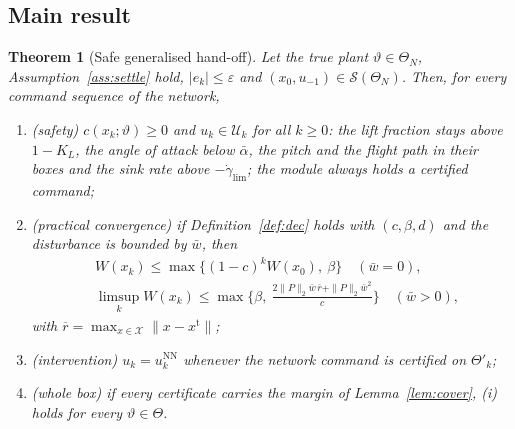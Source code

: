 \documentclass[final,5p,times,twocolumn]{elsarticle}
\newtheorem{theorem}{Theorem}\newtheorem{lemma}{Lemma}\newtheorem{proposition}{Proposition}\newtheorem{definition}{Definition}\newtheorem{assumption}{Assumption}\newtheorem{fact}{Fact}
\begin{document}
\subsection{Main result}
\begin{theorem}[Safe generalised hand-off]\label{thm:main}
Let the true plant $\vartheta\in\Theta_N$, Assumption~\ref{ass:settle} hold, $|e_k|\le\varepsilon$ and $(x_0,u_{-1})\in\mathcal S(\Theta_N)$. Then, for every command sequence of the network,
\begin{enumerate}[label=(\roman*),leftmargin=2em]
\item (safety) $c(x_k;\vartheta)\ge0$ and $u_k\in\mathcal U_k$ for all $k\ge0$: the lift fraction stays above $1-K_L$, the angle of attack below $\bar\alpha$, the pitch and the flight path in their boxes and the sink rate above $-\dot\gamma_{\lim}$; the module always holds a certified command;
\item (practical convergence) if Definition~\ref{def:dec} holds with $(c,\beta,d)$ and the disturbance is bounded by $\bar w$, then
\begin{equation}\label{eq:conv}
\begin{aligned}&W(x_k)\le\max\{(1-c)^kW(x_0),\ \beta\}\quad(\bar w=0),\\ &\limsup_{k}W(x_k)\le\max\Big\{\beta,\ \frac{2\|P\|_2\bar w\,\overline r+\|P\|_2\bar w^2}{c}\Big\}\quad(\bar w>0),\end{aligned}
\end{equation}
with $\overline r=\max_{x\in\mathcal X}\|x-x^{\mathrm t}\|$;
\item (intervention) $u_k=u^{\mathrm{NN}}_k$ whenever the network command is certified on $\Theta'_k$;
\item (whole box) if every certificate carries the margin of Lemma~\ref{lem:cover}, (i) holds for every $\vartheta\in\Theta$.
\end{enumerate}
\end{theorem}
\end{document}
